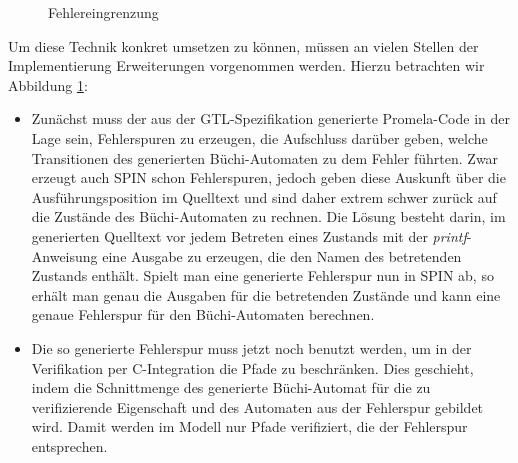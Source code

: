 \begin{figure}[h]
  \centering
  \caption{Fehlereingrenzung}
  \label{fig:error-refinement}
\end{figure}

Um diese Technik konkret umsetzen zu können, müssen an vielen Stellen der Implementierung Erweiterungen vorgenommen werden.
Hierzu betrachten wir Abbildung \ref{fig:error-refinement}:
\begin{itemize}
\item Zunächst muss der aus der GTL-Spezifikation generierte Promela-Code in der Lage sein, Fehlerspuren zu erzeugen, die Aufschluss darüber geben, welche Transitionen des generierten Büchi-Automaten zu dem Fehler führten.
  Zwar erzeugt auch SPIN schon Fehlerspuren, jedoch geben diese Auskunft über die Ausführungsposition im Quelltext und sind daher extrem schwer zurück auf die Zustände des Büchi-Automaten zu rechnen.
  Die Lösung besteht darin, im generierten Quelltext vor jedem Betreten eines Zustands mit der \emph{printf}-Anweisung eine Ausgabe zu erzeugen, die den Namen des betretenden Zustands enthält.
  Spielt man eine generierte Fehlerspur nun in SPIN ab, so erhält man genau die Ausgaben für die betretenden Zustände und kann eine genaue Fehlerspur für den Büchi-Automaten berechnen.
\item Die so generierte Fehlerspur muss jetzt noch benutzt werden, um in der Verifikation per C-Integration die Pfade zu beschränken.
  Dies geschieht, indem die Schnittmenge des generierte Büchi-Automat für die zu verifizierende Eigenschaft und des Automaten aus der Fehlerspur gebildet wird.
  Damit werden im Modell nur Pfade verifiziert, die der Fehlerspur entsprechen.
\end{itemize}
